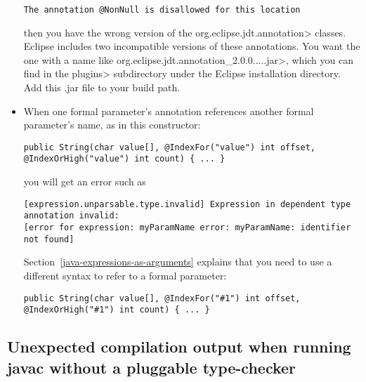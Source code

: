 \begin{itemize}
\begin{Verbatim}
The annotation @NonNull is disallowed for this location
\end{Verbatim}

\noindent
then you have the wrong version of the \<org.eclipse.jdt.annotation>
classes.  Eclipse includes two incompatible versions of these annotations.
You want the one with a name like
\<org.eclipse.jdt.annotation\_2.0.0.....jar>, which you can find in the
\<plugins> subdirectory under the Eclipse installation directory.
Add this .jar file to your build path.


\item
When one formal parameter's annotation references another formal
parameter's name, as in this constructor:

\begin{smaller}
\begin{Verbatim}
public String(char value[], @IndexFor("value") int offset, @IndexOrHigh("value") int count) { ... }
\end{Verbatim}
\end{smaller}

\noindent
you will get an error such as

\begin{smaller}
\begin{Verbatim}[]
[expression.unparsable.type.invalid] Expression in dependent type annotation invalid:
[error for expression: myParamName error: myParamName: identifier not found]
\end{Verbatim}
\end{smaller}

Section~\ref{java-expressions-as-arguments} explains that you need to use
a different syntax to refer to a formal parameter:

\begin{smaller}
\begin{Verbatim}
public String(char value[], @IndexFor("#1") int offset, @IndexOrHigh("#1") int count) { ... }
\end{Verbatim}
\end{smaller}


\end{itemize}


\subsection{Unexpected compilation output when running javac without a pluggable type-checker\label{common-problems-running-javac}}

